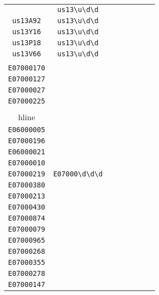 \begin{longtable}{cccccccc}
\begin{tabular}{ll}
    \verb|us13M78| & \verb|us13\u\d\d|\\
\verb|us13A92| & \verb|us13\u\d\d|\\
\verb|us13Y16| & \verb|us13\u\d\d|\\
\verb|us13P18| & \verb|us13\u\d\d|\\
\verb|us13V66| & \verb|us13\u\d\d|
\end{tabular}
\\\midrule 
\begin{tabular}{l}
    \verb|E07000193|\\
\verb|E07000170|\\
\verb|E07000127|\\
\verb|E07000027|\\
\verb|E07000225|\\
\\hline\\
\verb|E06000005|\\
\verb|E07000196|\\
\verb|E06000021|\\
\verb|E07000010|\\
\verb|E07000219|
\end{tabular}

&
\verb|E07000\d\d\d|
&

\begin{tabular}{l}
    \verb|E07000\d\d\d|\\
\verb|E07000380|\\
\verb|E07000213|\\
\verb|E07000430|\\
\verb|E07000874|\\
\verb|E07000079|
\end{tabular}

&

\begin{tabular}{l}
    \verb|E07000\d\d\d|\\
\verb|E07000965|\\
\verb|E07000268|\\
\verb|E07000355|\\
\verb|E07000278|\\
\verb|E07000147|
\end{tabular}

&


\end{longtable}
